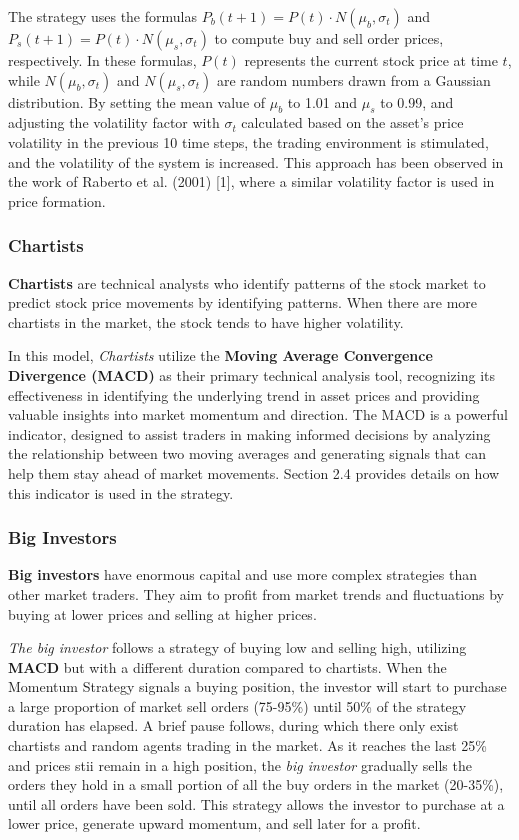 \documentclass[a4paper, 12pt]{article}
\begin{document}
            The strategy uses the formulas $P_b(t+1)=P(t)\cdot N(\mu_b,\sigma_t)$ and $P_s(t+1)=P(t)\cdot N(\mu_s,\sigma_t)$ to compute buy and sell order prices, respectively. In these formulas, $P(t)$ represents the current stock price at time $t$, while $N(\mu_b,\sigma_t)$ and $N(\mu_s,\sigma_t)$ are random numbers drawn from a Gaussian distribution. By setting the mean value of $\mu_b$ to 1.01 and $\mu_s$ to 0.99, and adjusting the volatility factor with $\sigma_t$ calculated based on the asset's price volatility in the previous 10 time steps, the trading environment is stimulated, and the volatility of the system is increased. This approach has been observed in the work of Raberto et al. (2001) [1], where a similar volatility factor is used in price formation.

        \subsubsection{Chartists}
            \textbf{Chartists} are technical analysts who identify patterns of the stock market to predict stock price movements by identifying patterns. When there are more chartists in the market, the stock tends to have higher volatility.

            In this model, \emph{Chartists} utilize the \textbf{Moving Average Convergence Divergence (MACD)} as their primary technical analysis tool, recognizing its effectiveness in identifying the underlying trend in asset prices and providing valuable insights into market momentum and direction. The MACD is a powerful indicator, designed to assist traders in making informed decisions by analyzing the relationship between two moving averages and generating signals that can help them stay ahead of market movements. Section 2.4 provides details on how this indicator is used in the strategy.
        
        
        
        \subsubsection{Big Investors}

            
            \textbf{Big investors} have enormous capital and use more complex strategies than other market traders. They aim to profit from market trends and fluctuations by buying at lower prices and selling at higher prices.

            \emph{The big investor} follows a strategy of buying low and selling high, utilizing \textbf{MACD} but with a different duration compared to chartists. When the Momentum Strategy signals a buying position, the investor will start to purchase a large proportion of market sell orders (75-95\%) until 50\% of the strategy duration has elapsed. A brief pause follows, during which there only exist chartists and random agents trading in the market. As it reaches the last 25\% and prices stii remain in a high position, the \emph{big investor} gradually sells the orders they hold in a small portion of all the buy orders in the market (20-35\%), until all orders have been sold. This strategy allows the investor to purchase at a lower price, generate upward momentum, and sell later for a profit.
            
\end{document}
